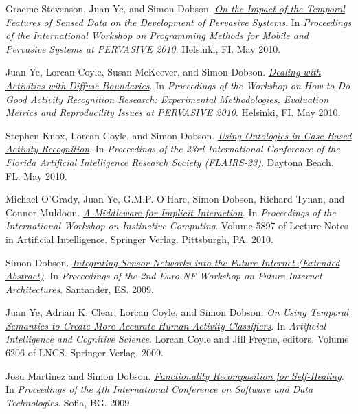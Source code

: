 \documentclass[11pt]{article}
\begin{document}
\label{org929458a}Graeme Stevenson, Juan Ye, and Simon Dobson.  \emph{\href{https://simondobson.org/softcopy/temporal-features-pmmps10.pdf}{On the Impact of the Temporal Features of Sensed Data on the Development of Pervasive Systems}}. In \emph{Proceedings of the International Workshop on Programming Methods for Mobile and Pervasive Systems at PERVASIVE 2010}. Helsinki, FI. May 2010.

\label{org72d487c}Juan Ye, Lorcan Coyle, Susan McKeever, and Simon Dobson.  \emph{\href{https://simondobson.org/softcopy/diffuse-boundaries-2010.pdf}{Dealing with Activities with Diffuse Boundaries}}. In \emph{Proceedings of the Workshop on How to Do Good Activity Recognition Research: Experimental Methodologies, Evaluation Metrics and Reproducility Issues at PERVASIVE 2010}. Helsinki, FI. May 2010.

\label{orgd8892ac}Stephen Knox, Lorcan Coyle, and Simon Dobson.  \emph{\href{https://simondobson.org/softcopy/2010flairs.pdf}{Using Ontologies in Case-Based Activity Recognition}}. In \emph{Proceedings of the 23rd International Conference of the Florida Artificial Intelligence Research Society (FLAIRS-23)}. Daytona Beach, FL. May 2010.

\label{org91a8dd6}Michael O’Grady, Juan Ye, G.M.P. O’Hare, Simon Dobson, Richard Tynan, and Connor Muldoon.  \emph{\href{https://simondobson.org/softcopy/implicit-interaction-10.pdf}{A Middleware for Implicit Interaction}}. In \emph{Proceedings of the International Workshop on Instinctive Computing}. Volume 5897 of Lecture Notes in Artificial Intelligence. Springer Verlag. Pittsburgh, PA. 2010.

\label{orgaa2509c}Simon Dobson.  \emph{\href{https://simondobson.org/softcopy/euro-nf-09.pdf}{Integrating Sensor Networks into the Future Internet (Extended Abstract)}}. In \emph{Proceedings of the 2nd Euro-NF Workshop on Future Internet Architectures}. Santander, ES. 2009.

\label{orgfae00f6}Juan Ye, Adrian K. Clear, Lorcan Coyle, and Simon Dobson.  \emph{\href{https://simondobson.org/softcopy/aics2009.pdf}{On Using Temporal Semantics to Create More Accurate Human-Activity Classifiers}}. In \emph{Artificial Intelligence and Cognitive Science}. Lorcan Coyle and Jill Freyne, editors. Volume 6206 of LNCS. Springer-Verlag. 2009.

\label{orgab6f5d2}Josu Martinez and Simon Dobson.  \emph{\href{https://simondobson.org/softcopy/fresh-icsoft09.pdf}{Functionality Recomposition for Self-Healing}}. In \emph{Proceedings of the 4th International Conference on Software and Data Technologies}. Sofia, BG. 2009.
\end{document}
